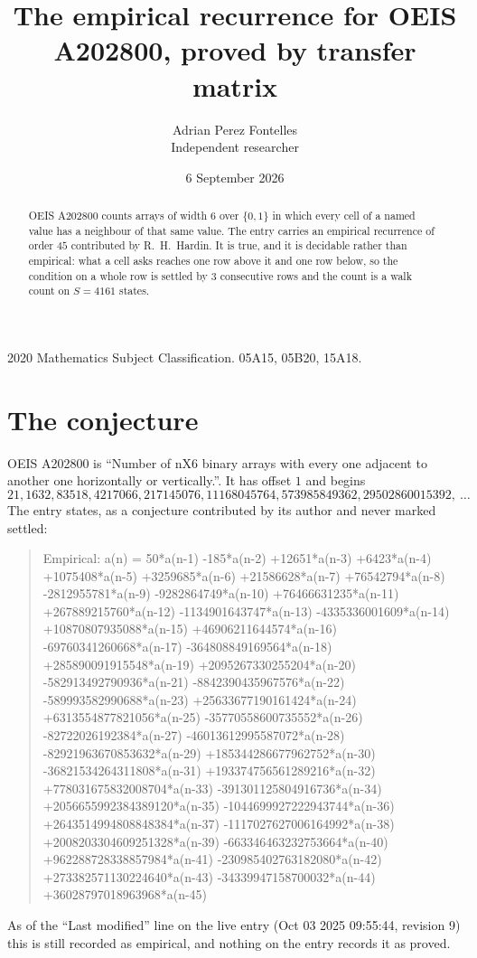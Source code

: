 \documentclass[11pt,a4paper]{article}
\title{The empirical recurrence for OEIS A202800, proved by transfer matrix}
\author{Adrian Perez Fontelles\\ \small Independent researcher}
\date{6 September 2026}
\theoremstyle{plain}
\theoremstyle{definition}
\begin{document}
\maketitle

\begin{abstract}
OEIS A202800 counts arrays of width $6$ over $\{0,1\}$ in which every cell of a named value has a neighbour of that same value. The entry carries an
empirical recurrence of order $45$ contributed by R.~H.~Hardin. It is true, and it is
decidable rather than empirical: what a cell asks reaches one row above it and one row below, so the
condition on a whole row is settled by $3$ consecutive rows and the count is a walk
count on $S=4161$ states.
\end{abstract}

\noindent\small 2020 Mathematics Subject Classification. 05A15, 05B20, 15A18.\normalsize

\section{The conjecture}

OEIS A202800 is ``Number of nX6 binary arrays with every one adjacent to another one horizontally or vertically.''. It has offset $1$ and begins
\[
21, 1632, 83518, 4217066, 217145076, 11168045764, 573985849362, 29502860015392,\ \dots
\]
The entry states, as a conjecture contributed by its author and never marked settled:
\begin{quote}
Empirical: a(n) = 50*a(n-1) -185*a(n-2) +12651*a(n-3) +6423*a(n-4) +1075408*a(n-5) +3259685*a(n-6) +21586628*a(n-7) +76542794*a(n-8) -2812955781*a(n-9) -9282864749*a(n-10) +76466631235*a(n-11) +267889215760*a(n-12) -1134901643747*a(n-13) -4335336001609*a(n-14) +10870807935088*a(n-15) +46906211644574*a(n-16) -69760341260668*a(n-17) -364808849169564*a(n-18) +285890091915548*a(n-19) +2095267330255204*a(n-20) -582913492790936*a(n-21) -8842390435967576*a(n-22) -589993582990688*a(n-23) +25633677190161424*a(n-24) +6313554877821056*a(n-25) -35770558600735552*a(n-26) -82722026192384*a(n-27) -46013612995587072*a(n-28) -82921963670853632*a(n-29) +185344286677962752*a(n-30) -36821534264311808*a(n-31) +193374756561289216*a(n-32) +778031675832008704*a(n-33) -391301125804916736*a(n-34) +2056655992384389120*a(n-35) -1044699927222943744*a(n-36) +2643514994808848384*a(n-37) -1117027627006164992*a(n-38) +2008203304609251328*a(n-39) -663346463232753664*a(n-40) +962288728338857984*a(n-41) -230985402763182080*a(n-42) +273382571130224640*a(n-43) -34339947158700032*a(n-44) +36028797018963968*a(n-45)
\end{quote}
As of the ``Last modified'' line on the live entry (Oct 03 2025 09:55:44, revision 9) this is still
recorded as empirical, and nothing on the entry records it as proved.
\end{document}

